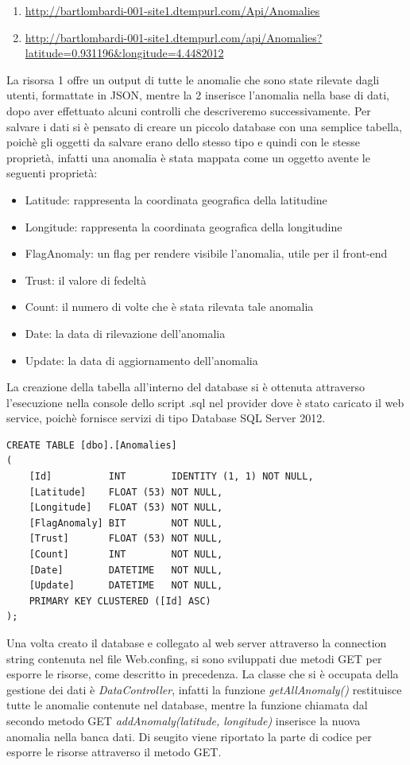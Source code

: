 \documentclass[a4paper, 11pt]{article} %
\begin{document}
\begin{enumerate}
	\item \url{http://bartlombardi-001-site1.dtempurl.com/Api/Anomalies}
	\item \url{http://bartlombardi-001-site1.dtempurl.com/api/Anomalies?latitude=0.931196&longitude=4.4482012}
\end{enumerate}
La risorsa 1 offre un output di tutte le anomalie che sono state rilevate dagli utenti, formattate in JSON, mentre la 2 inserisce l'anomalia nella base di dati, dopo aver effettuato alcuni controlli che descriveremo successivamente. Per salvare i dati si è pensato di creare un piccolo database con una semplice tabella, poichè gli oggetti da salvare erano dello stesso tipo e quindi con le stesse proprietà, infatti una anomalia è stata mappata come un oggetto avente le seguenti proprietà:
\begin{itemize}
	\item Latitude: rappresenta la coordinata geografica della latitudine
	\item Longitude: rappresenta la coordinata geografica della longitudine
	\item FlagAnomaly: un flag per rendere visibile l'anomalia, utile per il front-end
	\item Trust: il valore di fedeltà
	\item Count: il numero di volte che è stata rilevata tale anomalia
	\item Date: la data di rilevazione dell'anomalia
	\item Update: la data di aggiornamento dell'anomalia
\end{itemize}
La creazione della tabella all'interno del database si è ottenuta attraverso l'esecuzione nella console dello script .sql nel provider dove è stato caricato il web service, poichè fornisce servizi di tipo Database SQL Server 2012.
\begin{verbatim}
CREATE TABLE [dbo].[Anomalies] 
(
    [Id]          INT        IDENTITY (1, 1) NOT NULL,
    [Latitude]    FLOAT (53) NOT NULL,
    [Longitude]   FLOAT (53) NOT NULL,
    [FlagAnomaly] BIT        NOT NULL,
    [Trust]       FLOAT (53) NOT NULL,
    [Count]       INT        NOT NULL,
    [Date]        DATETIME   NOT NULL,
    [Update]      DATETIME   NOT NULL,
    PRIMARY KEY CLUSTERED ([Id] ASC)
);
\end{verbatim}
Una volta creato il database e collegato al web server attraverso la connection string contenuta nel file Web.confing, si sono sviluppati due metodi GET per esporre le risorse, come descritto in precedenza. La classe che si è occupata della gestione dei dati è \textit{DataController}, infatti la funzione \textit{getAllAnomaly()} restituisce tutte le anomalie contenute nel database, mentre la funzione chiamata dal secondo metodo GET \textit{addAnomaly(latitude, longitude)} inserisce la nuova anomalia nella banca dati. Di seugito viene riportato la parte di codice per esporre le risorse attraverso il metodo GET.
\end{document}

